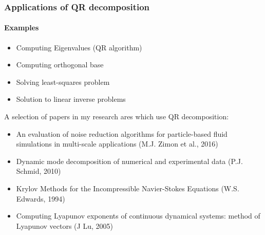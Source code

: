 \begin{frame}
\frametitle{Applications of QR decomposition}
\framesubtitle{Examples}
\begin{itemize}
 \item Computing Eigenvalues (QR algorithm)
 \item Computing orthogonal base 
 \item Solving least-squares problem
 \item Solution to linear inverse problems
\end{itemize}
A selection of papers in my research ares which use QR decomposition:
\begin{itemize}
 \item An evaluation of noise reduction algorithms for particle-based fluid simulations in multi-scale applications (M.J. Zimon et al., 2016)
 \item Dynamic mode decomposition of numerical and experimental data (P.J. Schmid, 2010)
 \item Krylov Methods for the Incompressible Navier-Stokes Equations (W.S. Edwards, 1994)
 \item Computing Lyapunov exponents of continuous dynamical systems: method of Lyapunov vectors (J Lu, 2005)
\end{itemize}

\end{frame}



